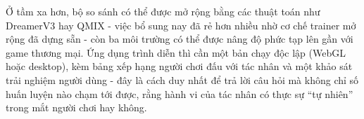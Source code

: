 \indent Ở tầm xa hơn, bộ so sánh có thể được mở rộng bằng các thuật toán như DreamerV3
hay QMIX - việc bổ sung nay đã rẻ hơn nhiều nhờ cơ chế trainer mở rộng đã dựng sẵn - còn
ba môi trường có thể được nâng độ phức tạp lên gần với game thương mại.
Ứng dụng trình diễn thì cần một bản chạy độc lập (WebGL hoặc desktop), kèm bảng xếp
hạng người chơi đấu với tác nhân và một khảo sát trải nghiệm người dùng - đây là cách
duy nhất để trả lời câu hỏi mà không chỉ số huấn luyện nào chạm tới được, rằng hành vi
của tác nhân có thực sự ``tự nhiên'' trong mắt người chơi hay không.
